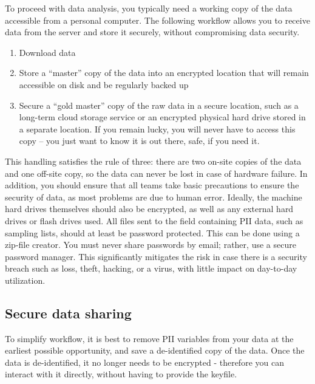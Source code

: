 To proceed with data analysis, you typically need a working copy of the data accessible from a personal computer. The following workflow allows you to receive data from the server and store it securely, without compromising data security.

\begin{enumerate}
	\item Download data
	\item Store a ``master'' copy of the data into an encrypted location that will remain accessible on disk and be regularly backed up
	\item Secure a ``gold master'' copy of the raw data in a secure location, such as a long-term cloud storage service or an encrypted physical hard drive stored in a separate location. If you remain lucky, you will never have to access this copy -- you just want to know it is out there, safe, if you need it.

\end{enumerate}

This handling satisfies the rule of three: there are two on-site copies of the data and one off-site copy, so the data can never be lost in case of hardware failure.
In addition, you should ensure that all teams take basic precautions to ensure the security of data, as most problems are due to human error.
Ideally, the machine hard drives themselves should also be encrypted, as well as any external hard drives or flash drives used.
All files sent to the field containing PII data, such as sampling lists, should at least be password protected. This can be done using a zip-file creator.
You must never share passwords by email; rather, use a secure password manager.
This significantly mitigates the risk in case there is a security breach such as loss, theft, hacking, or a virus, with little impact on day-to-day utilization.

\subsection{Secure data sharing}
To simplify workflow, it is best to remove PII variables from your data at the earliest possible opportunity, and save a de-identified copy of the data.
Once the data is de-identified, it no longer needs to be encrypted - therefore you can interact with it directly, without having to provide the keyfile.

